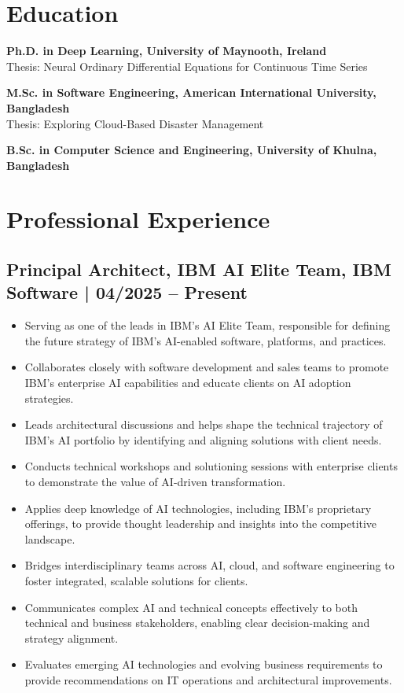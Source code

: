 \documentclass[12pt,parskip=half]{scrartcl}
\begin{document}
\vspace{0.3cm}

\section*{Education}
\noindent \textbf{Ph.D. in Deep Learning, University of Maynooth, Ireland} \\
Thesis: Neural Ordinary Differential Equations for Continuous Time Series

\noindent \textbf{M.Sc. in Software Engineering, American International University, Bangladesh}\\
Thesis: Exploring Cloud-Based Disaster Management

\noindent \textbf{B.Sc. in Computer Science and Engineering, University of Khulna, Bangladesh}

\vspace{0.3cm}

\section*{Professional Experience}

\subsection*{Principal Architect, IBM AI Elite Team, IBM Software | 04/2025 -- Present}
\begin{itemize}
    \item Serving as one of the leads in IBM’s AI Elite Team, responsible for defining the future strategy of IBM’s AI-enabled software, platforms, and practices.
    \item Collaborates closely with software development and sales teams to promote IBM’s enterprise AI capabilities and educate clients on AI adoption strategies.
    \item Leads architectural discussions and helps shape the technical trajectory of IBM’s AI portfolio by identifying and aligning solutions with client needs.
    \item Conducts technical workshops and solutioning sessions with enterprise clients to demonstrate the value of AI-driven transformation.
    \item Applies deep knowledge of AI technologies, including IBM’s proprietary offerings, to provide thought leadership and insights into the competitive landscape.
    \item Bridges interdisciplinary teams across AI, cloud, and software engineering to foster integrated, scalable solutions for clients.
    \item Communicates complex AI and technical concepts effectively to both technical and business stakeholders, enabling clear decision-making and strategy alignment.
    \item Evaluates emerging AI technologies and evolving business requirements to provide recommendations on IT operations and architectural improvements.
\end{itemize}
\end{document}

